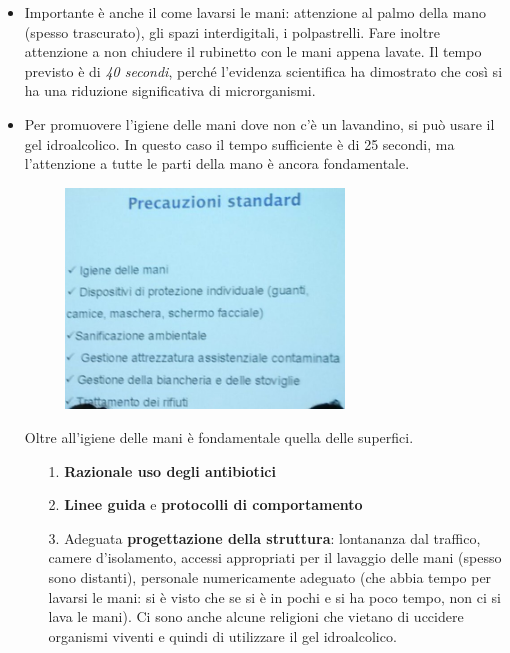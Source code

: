 \begin{itemize}
\item Importante è anche il come lavarsi le mani: attenzione al palmo della mano (spesso trascurato), gli spazi interdigitali, i polpastrelli. Fare inoltre attenzione a non chiudere il rubinetto con le mani appena lavate. Il tempo previsto è di \emph{40 secondi}, perché l'evidenza scientifica ha dimostrato che così si ha una riduzione significativa di microrganismi.

\item Per promuovere l'igiene delle mani dove non c'è un lavandino, si può usare il gel idroalcolico. In questo caso il tempo sufficiente è di 25 secondi, ma l'attenzione a tutte le parti della mano è ancora fondamentale.

\begin{figure}[!ht]
\centering
	\includegraphics[width=0.7\textwidth]{19/image13.jpeg}
	\end{figure}

Oltre all'igiene delle mani è fondamentale quella delle superfici.

\begin{itemize}
\item[1.] \textbf{Razionale uso degli antibiotici}
\item[2.] \textbf{Linee guida} e \textbf{protocolli di comportamento}
\item[3.] Adeguata \textbf{progettazione della struttura}: lontananza dal traffico, camere d'isolamento, accessi appropriati per il lavaggio delle mani (spesso sono distanti), personale numericamente adeguato (che abbia tempo per lavarsi le mani: si è visto che se si è in pochi e si ha poco tempo, non ci si lava le mani). Ci sono anche alcune religioni che vietano di uccidere organismi viventi e quindi di utilizzare il gel idroalcolico.
\end{itemize}


\end{itemize}

